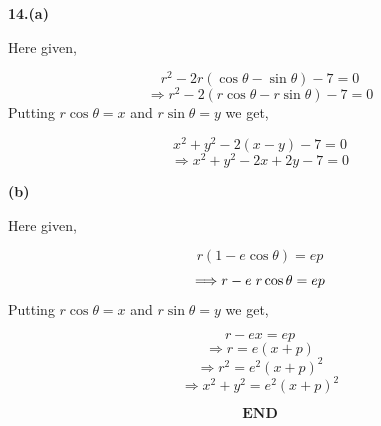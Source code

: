 \documentclass{article}
\begin{document}
\begin{flushleft}
\textbf{14.\hspace{0.4cm}(a)}\par
\vspace{0.5 cm}
Here given,\par
\[r^{2}-2r(\cos\theta-\sin\theta)-7 = 0\]
\[\Longrightarrow r^{2}-2(r\cos\theta -r\sin\theta)-7=0\]
Putting $r \cos \theta = x $ and $r \sin \theta = y $ we get,\par
\[x^{2}+y^{2}-2(x-y)-7=0\]
\[\Longrightarrow x^{2}+y^{2}-2x+2y-7=0\]\par
\vspace{1cm}
\textbf{\hspace{1cm}(b)}\par
\vspace{0.5cm}
Here given,\par
\[r(1- e\cos\theta) = ep\]
\[\Longrightarrow r - e\hspace{0.1cm} r\cos \theta = ep\]
Putting $r \cos \theta = x $ and $r \sin \theta = y $ we get,\par
\[r - ex = ep\]
\[\Longrightarrow r = e (x+p)\]
\[\Longrightarrow r^{2} = e^{2}(x+p)^{2}\]
\[\Longrightarrow x^{2}+y^{2} = e^{2} (x+p)^{2}\]\par
\vspace{8cm}
\[\textbf{END}\]


\end{flushleft}
\end{document}
